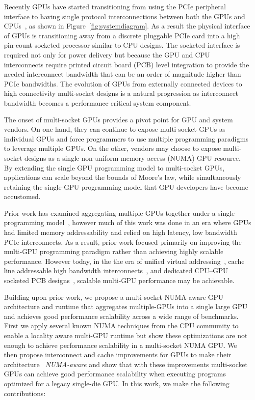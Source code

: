 Recently GPUs have started transitioning from using the PCIe peripheral 
interface to having single protocol interconnections between both the GPUs and 
CPUs~\cite{dgx,SierraHPC,AMDINFINITYFABRIC}, as shown in 
Figure~\ref{fig:systemdiagram}. As a result the physical interface of GPUs is 
transitioning away from a discrete pluggable PCIe card into a high pin-count 
socketed processor similar to CPU designs. The socketed interface is required 
not only for power delivery but because the GPU and CPU interconnects require 
printed circuit board (PCB) level integration to provide the needed 
interconnect bandwidth that can be an order of magnitude higher than PCIe 
bandwidths. The evolution of GPUs from externally connected devices to high 
connectivity multi-socket designs is a natural progression as interconnect 
bandwidth becomes a performance critical system component.

The onset of multi-socket GPUs provides a pivot point for GPU and system 
vendors. On one hand, they can continue to expose multi-socket GPUs as 
individual GPUs and force programmers to use multiple programming paradigms to 
leverage multiple GPUs. On the other, vendors may choose to expose multi-socket 
designs as a single non-uniform memory access (NUMA) GPU resource.  By 
extending the single GPU programming model to multi-socket GPUs,  applications 
can scale beyond the bounds of Moore's law, while simultaneously retaining the 
single-GPU programming model that GPU developers have become accustomed.

Prior work has examined aggregating multiple GPUs together under a single
programming model~\cite{lee2013transparent,Cabezas2015}, however much of this 
work
was done in an era where GPUs had limited memory addressability
and relied on high latency, low bandwidth PCIe interconnects.
As a result, prior work focused primarily on improving the multi-GPU programming
paradigm rather than achieving highly scalable performance.
However today, in the the era of unified virtual addressing~\cite{UVM},
cache line addressable high bandwidth interconnects~\cite{NVLINK}, and dedicated 
CPU--GPU
socketed PCB designs~\cite{SierraHPC}, scalable multi-GPU performance
may be achievable.

Building upon prior work, we propose a multi-socket NUMA-aware GPU architecture 
and runtime that aggregates multiple-GPUs into a single large GPU and achieves 
good performance scalability across a wide range of benchmarks.  First we apply 
several known NUMA techniques from the CPU community to enable a locality aware 
multi-GPU runtime but show these optimizations are not enough to achieve 
performance scalability in a multi-socket NUMA GPU.  We then propose 
interconnect and cache improvements for GPUs to make their architecture 
~\textit{NUMA-aware} and show that with these improvements multi-socket GPUs can 
achieve good performance scalability when executing programs optimized for a 
legacy single-die GPU. In this work, we make the following contributions:

